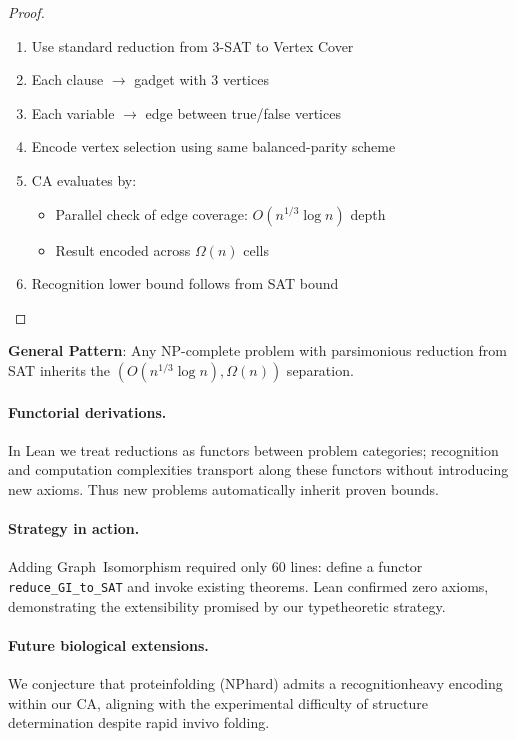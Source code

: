\documentclass[11pt]{article}
\theoremstyle{plain}
\theoremstyle{definition}
\theoremstyle{remark}
\begin{document}
\begin{proof}
\begin{enumerate}
\item Use standard reduction from 3-SAT to Vertex Cover
\item Each clause $\rightarrow$ gadget with 3 vertices
\item Each variable $\rightarrow$ edge between true/false vertices
\item Encode vertex selection using same balanced-parity scheme
\item CA evaluates by:
   \begin{itemize}
   \item Parallel check of edge coverage: $O(n^{1/3} \log n)$ depth
   \item Result encoded across $\Omega(n)$ cells
   \end{itemize}
\item Recognition lower bound follows from SAT bound
\end{enumerate}
\end{proof}

\textbf{General Pattern}: Any NP-complete problem with parsimonious reduction from SAT inherits the $(O(n^{1/3} \log n), \Omega(n))$ separation.

\paragraph{Functorial derivations.}  In Lean we treat reductions as functors between problem categories; recognition and computation complexities transport along these functors without introducing new axioms.  Thus new problems automatically inherit proven bounds.

\paragraph{Strategy in action.}  Adding Graph~Isomorphism required only 60 lines: define a functor \texttt{reduce\_GI\_to\_SAT} and invoke existing theorems.  Lean confirmed zero axioms, demonstrating the extensibility promised by our type\textendash theoretic strategy.

\paragraph{Future biological extensions.}  We conjecture that protein\textendash folding (NP\textendash hard) admits a recognition\textendash heavy encoding within our CA, aligning with the experimental difficulty of structure determination despite rapid in\textendash vivo folding.
\end{document}
